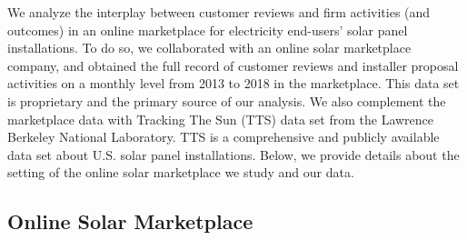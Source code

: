 \documentclass[msom,blindrev]{informs3}
\begin{document}
We analyze the interplay between customer reviews and firm activities (and outcomes) in an online marketplace for electricity end-users' solar panel installations. To do so, we collaborated with an online solar marketplace company, and obtained the full record of customer reviews and installer proposal activities on a monthly level from 2013 to 2018 in the marketplace. This data set is proprietary and the primary source of our analysis. We also complement the marketplace data with Tracking The Sun (TTS) data set from the Lawrence Berkeley National Laboratory. TTS is a comprehensive and publicly available data set about U.S. solar panel installations. Below, we provide details about the setting of the online solar marketplace we study and our data.



\subsection{Online Solar Marketplace}
\end{document}
